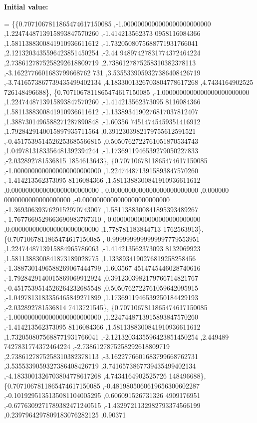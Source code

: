 {\bfseries Initial value\+:}
\begin{DoxyCode}
= \{\{0.7071067811865474617150085 ,-1.0000000000000000000000000 ,1.2247448713915893847570260 ,-1.414213562373
      0958116084366 ,1.5811388300841910936611612 ,-1.7320508075688771931766041 ,2.1213203435596423851450254 ,-2.44
      94897427831774372464224 ,2.7386127875258292618809719 ,2.7386127875258310382378113 ,-3.1622776601683799668762
      731 ,3.5355339059327386408426719 ,-3.7416573867739435499402134 ,4.1833001326703804778617268 ,4.7434164902525
      726148496688\},
\{0.7071067811865474617150085 ,-1.0000000000000000000000000 ,1.2247448713915893847570260 ,-1.414213562373095
      8116084366 ,1.5811388300841910936611612 ,-1.1338934190276817037812407 ,1.3887301496588271287890848 ,-1.60356
      74514745459351416912 ,1.7928429140015897935711564 ,0.3912303982179755612591521 ,-0.4517539514526253685566815
       ,0.5050762722761051870534743 ,1.0497813183356481392394244 ,-1.1736911946539279050227833 ,-2.032892781536815
      1854613643\},
\{0.7071067811865474617150085 ,-1.0000000000000000000000000 ,1.2247448713915893847570260 ,-1.414213562373095
      8116084366 ,1.5811388300841910936611612 ,0.0000000000000000000000000 ,-0.0000000000000000000000000 ,0.000000
      0000000000000000000 ,-0.0000000000000000000000000 ,-1.3693063937629152970743007 ,1.5811388300841895393489267
       ,-1.7677669529663690983767310 ,-0.0000000000000000000000000 ,0.0000000000000000000000000 ,1.778781183844713
      1762563913\},
\{0.7071067811865474617150085 ,-0.9999999999999997779553951 ,1.2247448713915884965786063 ,-1.414213562373093
      8132069923 ,1.5811388300841873189028775 ,1.1338934190276819258258456 ,-1.3887301496588269067444799 ,1.603567
      4514745446028740616 ,-1.7928429140015869069912924 ,0.3912303982179766714821767 ,-0.4517539514526264232685548
       ,0.5050762722761059642095915 ,-1.0497813183356465849271899 ,1.1736911946539250184429193 ,-2.032892781536814
      7413721545\},
\{0.7071067811865474617150085 ,-1.0000000000000000000000000 ,1.2247448713915893847570260 ,-1.414213562373095
      8116084366 ,1.5811388300841910936611612 ,1.7320508075688771931766041 ,-2.1213203435596423851450254 ,2.449489
      7427831774372464224 ,-2.7386127875258292618809719 ,2.7386127875258310382378113 ,-3.1622776601683799668762731
       ,3.5355339059327386408426719 ,3.7416573867739435499402134 ,-4.1833001326703804778617268 ,4.7434164902525726
      148496688\},
\{0.7071067811865474617150085 ,-0.4819805060619656300602287 ,-0.1019295135135081104005295 ,0.606091526731326
      4909176951 ,-0.6776309271789382471240515 ,-1.4329721132982793374566199 ,0.2397964297809183076282125 ,0.90371

\end{DoxyCode}
